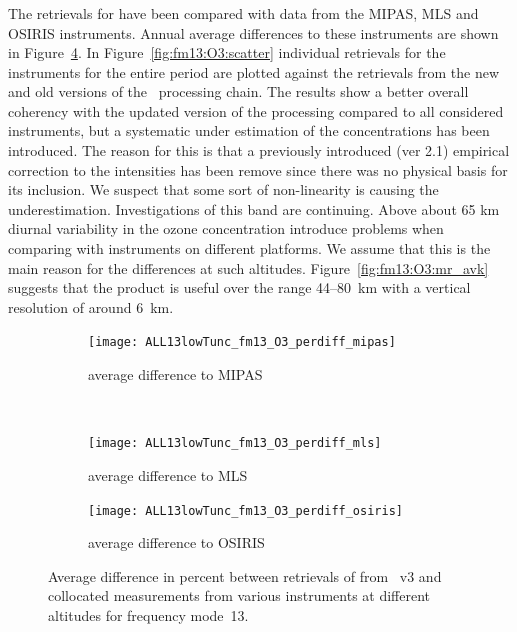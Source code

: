 \subsubsection{}
\label{sec:fm13:comparison:O3}
The retrievals for  have been compared with data from the MIPAS, MLS
and OSIRIS instruments. Annual average differences to these instruments are
shown in Figure~\ref{fig:fm13:O3:profiles}. In Figure~\ref{fig:fm13:O3:scatter}
individual retrievals for the instruments for the entire period are plotted
against the retrievals from the new and old versions of the \smr\ processing
chain. The results show a better overall coherency with the updated version of
the processing compared to all considered instruments, but a systematic under
estimation of the concentrations has been introduced. The reason for this is
that a previously introduced  (ver 2.1) empirical correction to the intensities
has been remove since there was no physical basis for its inclusion. We suspect
that some sort of non-linearity is causing the underestimation. Investigations
of this band are continuing.  Above about 65 km diurnal variability in the
ozone concentration introduce problems when comparing with instruments on
different platforms.   We assume that this is the main reason for the
differences at such altitudes.  Figure~\ref{fig:fm13:O3:mr_avk} suggests that
the product is useful over the range 44--80~km with a vertical resolution of
around 6~km.


\begin{figure}[tbhp]
    \centering
    \begin{subfigure}[b]{0.49\textwidth}
        \texttt{[image: ALL13lowTunc\_fm13\_O3\_perdiff\_mipas]}
        \caption{average difference to MIPAS}
        \label{fig:fm13:O3:profiles:MIPAS}
    \end{subfigure}
    \,
    \begin{subfigure}[b]{0.49\textwidth}
        \texttt{[image: ALL13lowTunc\_fm13\_O3\_perdiff\_mls]}
        \caption{average difference to MLS}
        \label{fig:fm13:O3:profiles:MLS}
    \end{subfigure}

    \begin{subfigure}[b]{0.49\textwidth}
        \texttt{[image: ALL13lowTunc\_fm13\_O3\_perdiff\_osiris]}
        \caption{average difference to OSIRIS}
        \label{fig:fm13:O3:profiles:OSIRIS}
    \end{subfigure}
    \caption{Average difference in percent between retrievals of 
    from \smr~v3 and collocated measurements from various instruments at
    different altitudes for frequency mode~13.}

    \label{fig:fm13:O3:profiles}
\end{figure}


